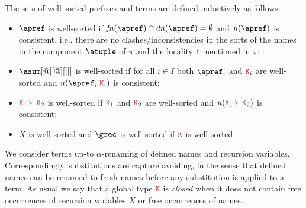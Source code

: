The sets of well-sorted prefixes and terms are defined inductively as
follows:
\begin{itemize}
\item $\apref$ is well-sorted if $\fn\apref\cap\dn\apref = \emptyset$
  and $\names\apref$ is consistent, i.e., there are no
  clashes/inconsistencies in the sorts of the names in the component
  $\atuple$ of $\pi$ and the locality ${\color{red}\ell}$ mentioned in $\pi$;
\item $\asum[@][@][][]$ is well-sorted if for all ${i\in I}$ both
  $\apref_i$ and ${\aK_i}$ are well-sorted and
  $\names {\apref_i.\aK_i}$ is consistent;
  \item $\aK_1 \seqop \aK_2$ is well-sorted if $\aK_1$ and $\aK_2$ are
  well-sorted and $\names{\aK_1 \seqop \aK_2}$ is consistent;
\item $X$ is well-sorted and $\grec$ is well-sorted if $\aK$ is
  well-sorted.
\end{itemize}


We consider terms up-to $\alpha$-renaming of defined names and
recursion variables.
%
Correspondingly, substitutions are capture avoiding, in the sense that
defined names can be renamed to fresh names before any substitution is
applied to a term.
%
As usual we say that a global type $\aK$ is \emph{closed} when it does
not contain free occurrences of recursion variables $X$ or free
occurrences of names.%


  
